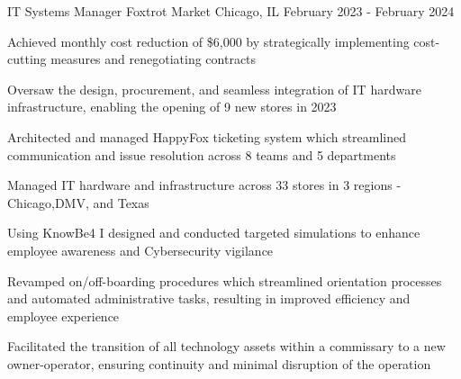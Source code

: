 \begin{cventries}
	\cventry
	{IT Systems Manager} %
  {Foxtrot Market} %
	{Chicago, IL} %
  {February 2023 - February 2024} %
	{
		\begin{cvitems} %
			\item {Achieved monthly cost reduction of \$6,000 by strategically implementing cost-cutting measures and renegotiating contracts}
			\item {Oversaw the design, procurement, and seamless integration of IT hardware infrastructure, enabling the opening of 9 new stores in 2023}
			\item {Architected and managed HappyFox ticketing system which streamlined communication and issue resolution across 8 teams and 5 departments}
			\item {Managed IT hardware and infrastructure across 33 stores in 3 regions - Chicago,DMV, and Texas}
			\item {Using KnowBe4 I designed and conducted targeted simulations to enhance employee awareness and Cybersecurity vigilance}
			\item {Revamped on/off-boarding procedures which streamlined orientation processes and automated administrative tasks, resulting in improved efficiency and employee experience}
			\item {Facilitated the transition of all technology assets within a commissary to a new owner-operator, ensuring continuity and minimal disruption of the operation}
		\end{cvitems}
	}


\end{cventries}
